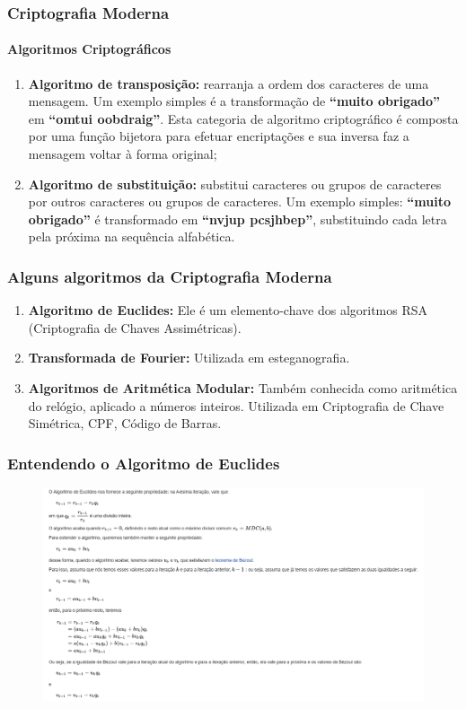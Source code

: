 \documentclass[compress]{beamer}
\begin{document}
\begin{frame}
\frametitle{Criptografia Moderna}
\framesubtitle{Algoritmos Criptográficos}
\begin{enumerate}
	\justifying
	\item<+->{\textbf{Algoritmo de transposição:} rearranja a ordem dos caracteres de uma mensagem. Um exemplo simples é a transformação de \textbf{“muito obrigado”} em \textbf{“omtui oobdraig”}. Esta categoria de algoritmo criptográfico é composta por uma função bijetora	para efetuar encriptações e sua	inversa faz a mensagem voltar à forma original;}
	\item<+->{\textbf{Algoritmo de substituição:} substitui caracteres ou grupos de caracteres por outros caracteres ou grupos de caracteres. Um exemplo simples: \textbf{“muito obrigado”} é transformado em \textbf{“nvjup pcsjhbep”}, substituindo cada letra pela próxima na sequência alfabética.}
\end{enumerate}
\end{frame}

\begin{frame}
\frametitle{Alguns algoritmos da Criptografia Moderna}
	\begin{enumerate}
		\justifying
		\item \textbf{Algoritmo de Euclides:} Ele é um elemento-chave dos algoritmos RSA (Criptografia de Chaves Assimétricas).
		\item \textbf{Transformada de Fourier:} Utilizada em esteganografia.
		\item \textbf{Algoritmos de Aritmética Modular:} Também conhecida como aritmética do relógio, aplicado a números inteiros. Utilizada em Criptografia de Chave Simétrica, CPF, Código de Barras.
	\end{enumerate}
\end{frame}

\begin{frame}
\frametitle{Entendendo o Algoritmo de Euclides}
\begin{figure}[h]
	\includegraphics[width=\textwidth]{pics/euclides_1}
\end{figure}
\end{frame}
\end{document}
